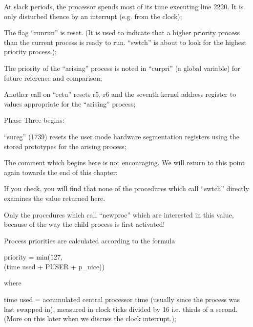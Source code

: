  At slack periods, the processor
spends most of its time executing
line 2220. It is only disturbed
thence by an interrupt (e.g. from
the clock);

\item[2196:] The flag ``runrun'' is reset. (It
 is used to indicate that a higher
 priority process than the current
 process is ready to run. ``swtch''
 is about to look for the highest
 priority process.);

\item[2224:] The priority of the ``arising''
 process is noted in ``curpri'' (a
 global variable) for future
 reference and comparison;

\item[2228:] Another call on ``retu'' resets r5,
 r6 and the seventh kernel address
 register to values appropriate
 for the ``arising'' process;

\item[2229:] Phase Three begins:

``sureg'' (1739) resets the user
mode hardware segmentation registers using the stored prototypes
for the arising process;

\item[2230:] The comment which begins here is
 not encouraging. We will return
 to this point again towards the
 end of this chapter;

\item[2247:] If you check, you will find that
none of the procedures which call
``swtch'' directly examines the
value returned here.

Only the procedures which call
``newproc'' which are interested in
this value, because of the way
the child process is first
activated!
\ed



\bd
\item[2161:] Process priorities are calculated
 according to the formula

\begin{tabbing}
priority = min(\= 127,\\
\> (time used + PUSER + p\_nice))\\
\end{tabbing}

where
\bd
 \item[(1)] time used = accumulated central
 processor time (usually since the
 process was last swapped in),
 measured in clock ticks divided
 by 16 i.e. thirds of a second.
 (More on this later when we discuss the clock interrupt.);

